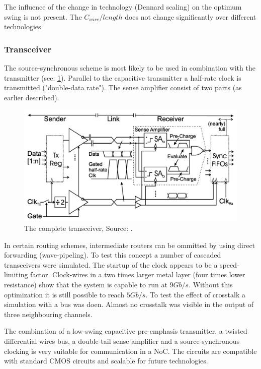 The influence of the change in technology (Dennard scaling) on the optimum swing is not present.
The $C_{wire}/length$ does not change significantly over different technologies



\subsubsection{Transceiver} \label{sss:rep2:transceiver}
The source-synchronous scheme is most likely to be used in combination with the transmitter (see: \cref{fig:rep2:transceiver}).
Parallel to the capacitive transmitter a half-rate clock is transmitted ("double-data rate").
The sense amplifier consist of two parts (as earlier described).


\begin{figure}	\centering
	
	\includegraphics[width=0.9\linewidth]{Figures/Rep2Transceiver.png}
	\caption{The complete transceiver, Source: \cite{schinkel2009low}.} 
    \label{fig:rep2:transceiver}
\end{figure}


In certain routing schemes, intermediate routers can be ommitted by using direct forwarding (wave-pipeling).
To test this concept a number of cascaded transceivers were simulated.
The startup of the clock appears to be a speed-limiting factor.
Clock-wires in a two times larger metal layer (four times lower resistance) show that the system is capable to run at $9 Gb/s$.
Without this optimization it is still possible to reach $5 Gb/s$.
To test the effect of crosstalk a simulation with a bus was doen.
Almost no crosstalk was visible in the output of three neighbouring channels.

The combination of a low-swing capacitive pre-emphasis transmitter, a twisted differential wires bus, a double-tail sense amplifier and a source-synchronous clocking is very suitable for communication in a NoC.
The circuits are compatible with standard CMOS circuits and scalable for future technologies.